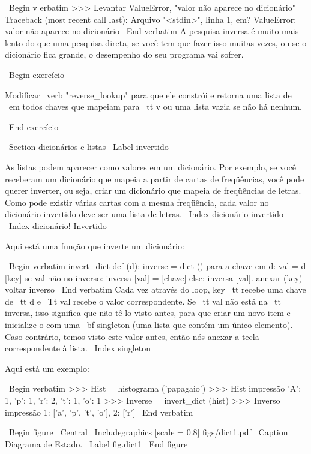\documentclass[10pt]{book}
\begin{document}
\begin {itemize}
{{{{{{{\ Begin {v erbatim}
>>> Levantar ValueError, "valor não aparece no dicionário"
Traceback (most recent call last):
  Arquivo "<stdin>", linha 1, em?
ValueError: valor não aparece no dicionário
\ End {verbatim}
%
A pesquisa inversa é muito mais lento do que uma pesquisa direta, se você
tem que fazer isso muitas vezes, ou se o dicionário fica grande, o desempenho
do seu programa vai sofrer.

\ Begin {} exercício

Modificar \ verb "reverse_lookup" para que ele constrói e retorna uma lista
de {\ em todos} chaves que mapeiam para {\ tt v} ou uma lista vazia se não
há nenhum.

\ End {} exercício


\ Section {dicionários e listas}
\ Label {invertido}

As listas podem aparecer como valores em um dicionário. Por exemplo, se você
receberam um dicionário que mapeia a partir de cartas de freqüências, você
pode querer inverter, ou seja, criar um dicionário que mapeia
de freqüências de letras. Como pode existir várias cartas
com a mesma freqüência, cada valor no dicionário invertido
deve ser uma lista de letras.
\ Index {dicionário invertido}
\ Index {dicionário! Invertido}

Aqui está uma função que inverte um dicionário:

\ Begin {verbatim}
invert_dict def (d):
    inverse = dict ()
    para a chave em d:
        val = d [key]
        se val não no inverso:
            inversa [val] = [chave]
        else:
            inversa [val]. anexar (key)
    voltar inverso
\ End {verbatim}
%
Cada vez através do loop, {key \ tt} recebe uma chave de {\ tt d} e 
{\ Tt val} recebe o valor correspondente. Se {\ tt val} não está na {\ tt inversa},
isso significa que não tê-lo visto antes, para que criar um novo item e
inicialize-o com uma {\ bf singleton} (uma lista que contém um
único elemento). Caso contrário, temos visto este valor antes, então nós
anexar a tecla correspondente à lista.
\ Index {singleton}

Aqui está um exemplo:

\ Begin {verbatim}
>>> Hist = histograma ('papagaio')
>>> Hist impressão
{'A': 1, 'p': 1, 'r': 2, 't': 1, 'o': 1}
>>> Inverse = invert_dict (hist)
>>> Inverso impressão
{1: ['a', 'p', 't', 'o'], 2: ['r']}
\ End {verbatim}

\ Begin {figure}
\ Central
{\ Includegraphics [scale = 0.8] {figs/dict1.pdf}}
\ Caption {Diagrama de Estado.}
\ Label {} fig.dict1
\ End {figure}

}}}}}}}
\end{itemize}
\end{document}
